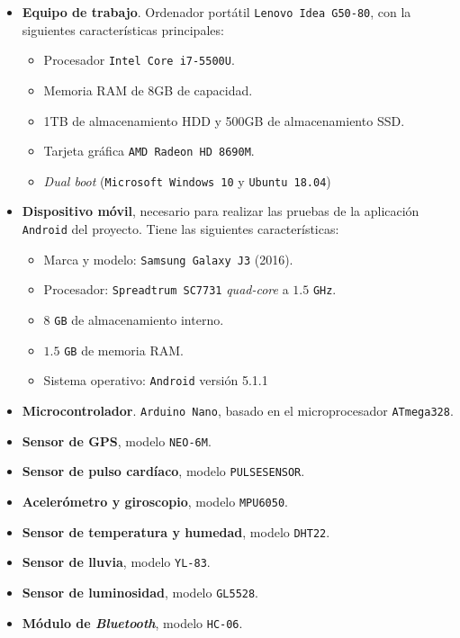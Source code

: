 \begin{itemize}
\item \textbf{Equipo de trabajo}. Ordenador portátil \texttt{Lenovo Idea G50-80}, con la siguientes características principales:
  \begin{itemize}
  \item Procesador \texttt{Intel Core i7-5500U}.
  \item Memoria \ac{RAM} de 8GB de capacidad.
  \item 1TB de almacenamiento \ac{HDD} y 500GB de almacenamiento \ac{SSD}.
  \item Tarjeta gráfica \texttt{AMD Radeon HD 8690M}.
  \item \textit{Dual boot} (\texttt{Microsoft Windows 10} y \texttt{Ubuntu 18.04})
  \end{itemize}
\item \textbf{Dispositivo móvil}, necesario para realizar las pruebas de la aplicación \texttt{Android} del proyecto. Tiene las siguientes características:
  \begin{itemize}
  \item Marca y modelo: \texttt{Samsung Galaxy J3} (2016).
  \item Procesador: \texttt{Spreadtrum SC7731} \textit{quad-core} a $1.5$ \texttt{GHz}.
  \item 8 \texttt{GB} de almacenamiento interno.
  \item $1.5$ \texttt{GB} de memoria \ac{RAM}.
  \item Sistema operativo: \texttt{Android} versión 5.1.1
  \end{itemize}
\item \textbf{Microcontrolador}. \texttt{Arduino Nano}, basado en el microprocesador \texttt{ATmega328}.
\item \textbf{Sensor de GPS}, modelo \texttt{NEO-6M}.
\item \textbf{Sensor de pulso cardíaco}, modelo \texttt{PULSESENSOR}.
\item \textbf{Acelerómetro y giroscopio}, modelo \texttt{MPU6050}.
\item \textbf{Sensor de temperatura y humedad}, modelo \texttt{DHT22}.
\item \textbf{Sensor de lluvia}, modelo \texttt{YL-83}.
\item \textbf{Sensor de luminosidad}, modelo \texttt{GL5528}.
\item \textbf{Módulo de \textit{Bluetooth}}, modelo \texttt{HC-06}.
\end{itemize}


